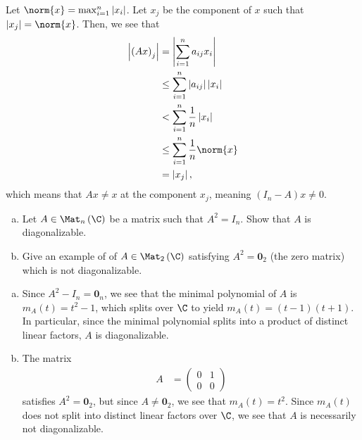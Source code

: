 \documentclass[10pt]{mypackage}
\begin{document}
\begin{solution}
  Let $\norm{x} = \max_{i=1}^{n} \left\vert x_i \right\vert$. Let $x_j$ be the component of $x$ such that $\left\vert x_j \right\vert = \norm{x}$. Then, we see that
  \begin{align*}
    \left\vert \left( Ax \right)_j \right\vert &= \left\vert \sum_{i=1}^{n}a_{ij}x_i \right\vert\\
                                               &\leq \sum_{i=1}^{n} \left\vert a_{ij} \right\vert\left\vert x_i \right\vert\\
                                               &< \sum_{i=1}^{n} \frac{1}{n}\left\vert x_i \right\vert\\
                                               &\leq \sum_{i=1}^{n}\frac{1}{n}\norm{x}\\
                                               &= \left\vert x_j \right\vert,
  \end{align*}
  which means that $Ax\neq x$ at the component $x_j$, meaning $\left( I_n - A \right)x \neq 0$.
\end{solution}
\begin{problem}[Problem 7]\hfill
  \begin{enumerate}[(a)]
    \item Let $A\in \Mat_{n}\left( \C \right)$ be a matrix such that $A^2 = I_{n}$. Show that $A$ is diagonalizable.
    \item Give an example of of $A\in \Mat_{2}\left( \C \right)$ satisfying $A^2 = \mathbf{0}_{2}$ (the zero matrix) which is not diagonalizable.
  \end{enumerate}
\end{problem}
\begin{solution}\hfill
  \begin{enumerate}[(a)]
    \item Since $A^2- I_n = \mathbf{0}_{n}$, we see that the minimal polynomial of $A$ is $m_A(t) = t^2 - 1$, which splits over $\C$ to yield $m_A(t) = \left( t-1 \right)\left( t+1 \right)$. In particular, since the minimal polynomial splits into a product of distinct linear factors, $A$ is diagonalizable.
    \item The matrix
      \begin{align*}
        A &= \begin{pmatrix}0 & 1 \\ 0 & 0\end{pmatrix}
      \end{align*}
      satisfies $A^2 = \mathbf{0}_{2}$, but since $A \neq \mathbf{0}_{2}$, we see that $m_{A}(t) = t^2$. Since $m_A(t)$ does not split into distinct linear factors over $\C$, we see that $A$ is necessarily not diagonalizable.
  \end{enumerate}
\end{solution}
\end{document}
